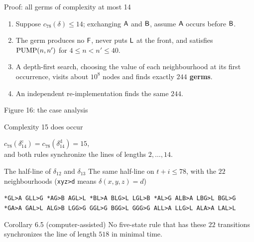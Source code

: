 \begin{frame}{Proof: all germs of complexity at most 14}
\begin{enumerate}
\item Suppose $c_{78}(\delta)\le14$; exchanging $\mathsf A$ and $\mathsf B$, assume $\mathsf A$ occurs before $\mathsf B$.
\item The germ produces no $\mathsf F$, never puts $\mathsf L$ at the front, and satisfies $\mathrm{PUMP}(n,n')$ for $4\le n<n'\le40$.
\item A depth-first search, choosing the value of each neighbourhood at its first occurrence, visits about $10^8$ nodes and finds exactly \textbf{$244$ germs}.
\item An independent re-implementation finds the same $244$. 
\end{enumerate}
\end{frame}

\begin{frame}{Figure 16: the case analysis}
\centering\fig[0.66]{}\\[0.5ex]
\small
{}%
\end{frame}

\begin{frame}{Complexity 15 does occur}
\vspace{5ex}
\begin{center}\Large
$c_{78}(\delta_{14}^{\mathrm c})=c_{78}(\delta_{14}^{\mathrm d})=15$,\\[1ex]
and both rules synchronize the lines of lengths $2,\dots,14$.
\end{center}
\end{frame}

\begin{frame}{The half-line of $\delta_{12}$ and $\delta_{13}$}
\small The same half-line on $t+i\le78$, with the $22$ neighbourhoods (\texttt{xyz>d} means $\delta(x,y,z)=d$)
\begin{center}\footnotesize
\texttt{*GL>A GLL>G *AG>B AGL>L *BL>A BLG>L LGL>B *AL>G ALB>A LBG>L BGL>G}\\
\texttt{*GA>A GAL>L ALG>B LGG>G GGL>G BGG>L GGG>G ALL>A LLG>L ALA>A LAL>L}
\end{center}
\vspace{1ex}
\begin{statement}{Corollary 6.5 (computer-assisted)}
No five-state rule that has these $22$ transitions synchronizes the line of length $518$ in minimal time.
\end{statement}
\end{frame}

